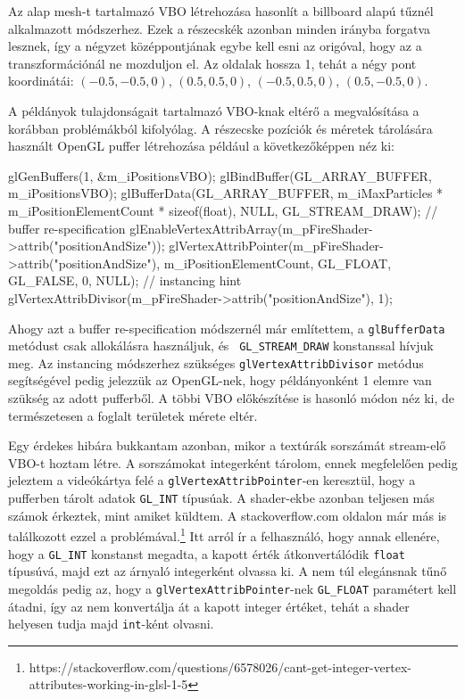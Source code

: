 Az alap mesh-t tartalmazó VBO létrehozása hasonlít a billboard alapú tűznél alkalmazott módszerhez. Ezek a részecskék azonban minden irányba forgatva lesznek, így a négyzet középpontjának egybe kell esni az origóval, hogy az a transzformációnál ne mozduljon el. Az oldalak hossza 1, tehát a négy pont koordinátái: $(-0.5, -0.5, 0)$, $(0.5, 0.5, 0)$, $(-0.5, 0.5, 0)$, $(0.5, -0.5, 0)$.

A példányok tulajdonságait tartalmazó VBO-knak eltérő a megvalósítása a korábban problémákból kifolyólag. A részecske pozíciók és méretek tárolására használt OpenGL puffer létrehozása például a következőképpen néz ki:
\begin{cpp}
glGenBuffers(1, &m_iPositionsVBO);
glBindBuffer(GL_ARRAY_BUFFER, m_iPositionsVBO);
glBufferData(GL_ARRAY_BUFFER, 
	m_iMaxParticles * m_iPositionElementCount * sizeof(float), 
	NULL, GL_STREAM_DRAW); // buffer re-specification
glEnableVertexAttribArray(m_pFireShader->attrib("positionAndSize"));
glVertexAttribPointer(m_pFireShader->attrib("positionAndSize"), 
	m_iPositionElementCount, GL_FLOAT, GL_FALSE, 0, NULL);
// instancing hint
glVertexAttribDivisor(m_pFireShader->attrib("positionAndSize"), 1);
\end{cpp}
Ahogy azt a buffer re-specification módszernél már említettem, a \texttt{glBufferData} metódust csak allokálásra használjuk, és \texttt{ GL\_STREAM\_DRAW} konstanssal hívjuk meg. Az instancing módszerhez szükséges \texttt{glVertexAttribDivisor} metódus segítségével pedig jelezzük az OpenGL-nek, hogy példányonként 1 elemre van szükség az adott pufferből. A többi VBO előkészítése is hasonló módon néz ki, de természetesen a foglalt területek mérete eltér.

Egy érdekes hibára bukkantam azonban, mikor a textúrák sorszámát stream-elő VBO-t hoztam létre. A sorszámokat integerként tárolom, ennek megfelelően pedig jeleztem a videókártya felé a \texttt{glVertexAttribPointer}-en keresztül, hogy a pufferben tárolt adatok \texttt{GL\_INT} típusúak. A shader-ekbe azonban teljesen más számok érkeztek, mint amiket küldtem. A stackoverflow.com oldalon már más is találkozott ezzel a problémával.\footnote{https://stackoverflow.com/questions/6578026/cant-get-integer-vertex-attributes-working-in-glsl-1-5} Itt arról ír a felhasználó, hogy annak ellenére, hogy a \texttt{GL\_INT} konstanst megadta, a kapott érték átkonvertálódik \texttt{float} típusúvá, majd ezt az árnyaló integerként olvassa ki. A nem túl elegánsnak tűnő megoldás pedig az, hogy a \texttt{glVertexAttribPointer}-nek  \texttt{GL\_FLOAT} paramétert kell átadni, így az nem konvertálja át a kapott integer értéket, tehát a shader helyesen tudja majd \texttt{int}-ként olvasni.

